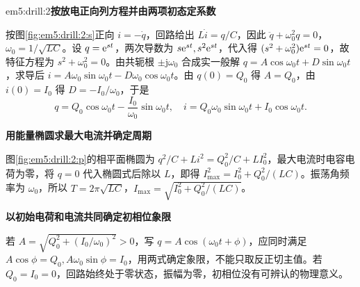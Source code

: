 \begin{drillsolution}{em5:drill:2}\textbf{按放电正向列方程并由两项初态定系数}\par\nobreak
按图\ref{fig:em5:drill:2:s}正向 $i=-\dot q$，回路给出 $L\dot i=q/C$，因此 $\ddot q+\omega_0^2q=0$，$\omega_0=1/\sqrt{LC}$。设 $q=\mathrm e^{st}$，两次导数为 $s\mathrm e^{st},s^2\mathrm e^{st}$，代入得 $(s^2+\omega_0^2)\mathrm e^{st}=0$，故特征方程为 $s^2+\omega_0^2=0$。由共轭根 $\pm\mathrm j\omega_0$ 合成实一般解 $q=A\cos\omega_0t+D\sin\omega_0t$，求导后 $i=A\omega_0\sin\omega_0t-D\omega_0\cos\omega_0t$。由 $q(0)=Q_0$ 得 $A=Q_0$，由 $i(0)=I_0$ 得 $D=-I_0/\omega_0$，于是
\[q=Q_0\cos\omega_0t-\frac{I_0}{\omega_0}\sin\omega_0t,\quad i=Q_0\omega_0\sin\omega_0t+I_0\cos\omega_0t.\]



\par\medskip{}\noindent\textbf{用能量椭圆求最大电流并确定周期}\par\nobreak
图\ref{fig:em5:drill:2:p}的相平面椭圆为 $q^2/C+Li^2=Q_0^2/C+LI_0^2$，最大电流时电容电荷为零，将 $q=0$ 代入椭圆式后除以 $L$，即得 $I_{\max}^2=I_0^2+Q_0^2/(LC)$。振荡角频率为 $\omega_0$，所以 $T=2\pi\sqrt{LC}$，$I_{\max}=\sqrt{I_0^2+Q_0^2/(LC)}$。

\par\medskip{}\noindent\textbf{以初始电荷和电流共同确定初相位象限}\par\nobreak
若 $A=\sqrt{Q_0^2+(I_0/\omega_0)^2}>0$，写 $q=A\cos(\omega_0t+\phi)$，应同时满足 $A\cos\phi=Q_0,A\omega_0\sin\phi=I_0$，用两式确定象限，不能只取反正切主值。若 $Q_0=I_0=0$，回路始终处于零状态，振幅为零，初相位没有可辨认的物理意义。\end{drillsolution}
